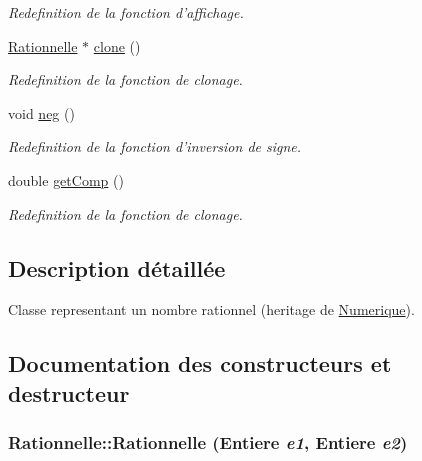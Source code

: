 \begin{CompactItemize}
\begin{CompactList}\small\item\em Redefinition de la fonction d'affichage. \item\end{CompactList}\item 
\hypertarget{class_rationnelle_ba6dca31aee851018c69ac3c5b8dd81a}{
\hyperlink{class_rationnelle}{Rationnelle} $\ast$ \hyperlink{class_rationnelle_ba6dca31aee851018c69ac3c5b8dd81a}{clone} ()}
\label{class_rationnelle_ba6dca31aee851018c69ac3c5b8dd81a}

\begin{CompactList}\small\item\em Redefinition de la fonction de clonage. \item\end{CompactList}\item 
\hypertarget{class_rationnelle_1bb63e8e86011146a11507c948ed1410}{
void \hyperlink{class_rationnelle_1bb63e8e86011146a11507c948ed1410}{neg} ()}
\label{class_rationnelle_1bb63e8e86011146a11507c948ed1410}

\begin{CompactList}\small\item\em Redefinition de la fonction d'inversion de signe. \item\end{CompactList}\item 
\hypertarget{class_rationnelle_618f3d0c3b9bdb27bf279b8ecbb5a392}{
double \hyperlink{class_rationnelle_618f3d0c3b9bdb27bf279b8ecbb5a392}{getComp} ()}
\label{class_rationnelle_618f3d0c3b9bdb27bf279b8ecbb5a392}

\begin{CompactList}\small\item\em Redefinition de la fonction de clonage. \item\end{CompactList}\end{CompactItemize}


\subsection{Description détaillée}
Classe representant un nombre rationnel (heritage de \hyperlink{class_numerique}{Numerique}). 

\subsection{Documentation des constructeurs et destructeur}
\hypertarget{class_rationnelle_80e2778456d58509340e31e304d77b8f}{
\subsubsection[{Rationnelle}]{\setlength{\rightskip}{0pt plus 5cm}Rationnelle::Rationnelle ({\bf Entiere} {\em e1}, \/  {\bf Entiere} {\em e2})}}
\label{class_rationnelle_80e2778456d58509340e31e304d77b8f}


